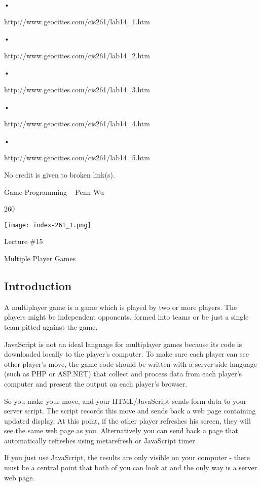 \documentclass[
]{article}
\begin{document}
•

http://www.geocities.com/cis261/lab14\_1.htm

•

http://www.geocities.com/cis261/lab14\_2.htm

•

http://www.geocities.com/cis261/lab14\_3.htm

•

http://www.geocities.com/cis261/lab14\_4.htm

•

http://www.geocities.com/cis261/lab14\_5.htm

No credit is given to broken link(s).

Game Programming -- Penn Wu

260

\protect\hypertarget{index_split_013.htmlux5cux23p261}{}{}\texttt{[image: index-261\_1.png]}

Lecture \#15

Multiple Player Games

\protect\hypertarget{index_split_014.html}{}{}

\hypertarget{index_split_014.htmlux5cux23calibre_pb_13}{%
\subsection{Introduction}\label{index_split_014.htmlux5cux23calibre_pb_13}}

A multiplayer game is a game which is played by two or more players. The
players might be independent opponents, formed into teams or be just a
single team pitted against the game.

JavaScript is not an ideal language for multiplayer games because its
code is downloaded locally to the player's computer. To make sure each
player can see other player's move, the game code should be written with
a server-side language (such as PHP or ASP.NET) that collect and process
data from each player's computer and present the output on each player's
browser.

So you make your move, and your HTML/JavaScript sends form data to your
server script. The script records this move and sends back a web page
containing updated display. At this point, if the other player refreshes
his screen, they will see the same web page as you. Alternatively you
can send back a page that automatically refreshes using metarefresh or
JavaScript timer.

If you just use JavaScript, the results are only visible on your
computer - there must be a central point that both of you can look at
and the only way is a server web page.
\end{document}
